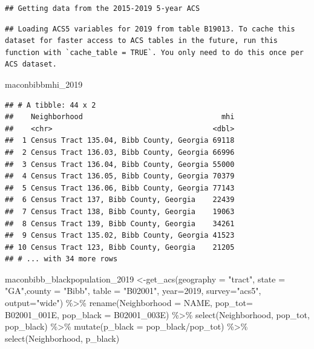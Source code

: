 \documentclass[
]{article}
\newenvironment{Shaded}{\begin{snugshade}}{\end{snugshade}}
\newcommand{\AttributeTok}[1]{\textcolor[rgb]{0.77,0.63,0.00}{#1}}
\newcommand{\DecValTok}[1]{\textcolor[rgb]{0.00,0.00,0.81}{#1}}
\newcommand{\FunctionTok}[1]{\textcolor[rgb]{0.00,0.00,0.00}{#1}}
\newcommand{\NormalTok}[1]{#1}
\newcommand{\OtherTok}[1]{\textcolor[rgb]{0.56,0.35,0.01}{#1}}
\newcommand{\SpecialCharTok}[1]{\textcolor[rgb]{0.00,0.00,0.00}{#1}}
\newcommand{\StringTok}[1]{\textcolor[rgb]{0.31,0.60,0.02}{#1}}
\begin{document}
\begin{verbatim}
## Getting data from the 2015-2019 5-year ACS
\end{verbatim}

\begin{verbatim}
## Loading ACS5 variables for 2019 from table B19013. To cache this dataset for faster access to ACS tables in the future, run this function with `cache_table = TRUE`. You only need to do this once per ACS dataset.
\end{verbatim}

\begin{Shaded}
\begin{Highlighting}[]
\NormalTok{maconbibbmhi\_2019 }
\end{Highlighting}
\end{Shaded}

\begin{verbatim}
## # A tibble: 44 x 2
##    Neighborhood                                mhi
##    <chr>                                     <dbl>
##  1 Census Tract 135.04, Bibb County, Georgia 69118
##  2 Census Tract 136.03, Bibb County, Georgia 66996
##  3 Census Tract 136.04, Bibb County, Georgia 55000
##  4 Census Tract 136.05, Bibb County, Georgia 70379
##  5 Census Tract 136.06, Bibb County, Georgia 77143
##  6 Census Tract 137, Bibb County, Georgia    22439
##  7 Census Tract 138, Bibb County, Georgia    19063
##  8 Census Tract 139, Bibb County, Georgia    34261
##  9 Census Tract 135.02, Bibb County, Georgia 41523
## 10 Census Tract 123, Bibb County, Georgia    21205
## # ... with 34 more rows
\end{verbatim}

\begin{Shaded}
\begin{Highlighting}[]
\NormalTok{maconbibb\_blackpopulation\_2019 }\OtherTok{\textless{}{-}}\FunctionTok{get\_acs}\NormalTok{(}\AttributeTok{geography =} \StringTok{"tract"}\NormalTok{, }\AttributeTok{state =} \StringTok{"GA"}\NormalTok{,}\AttributeTok{county =} \StringTok{"Bibb"}\NormalTok{, }\AttributeTok{table =} \StringTok{"B02001"}\NormalTok{, }\AttributeTok{year=}\DecValTok{2019}\NormalTok{, }\AttributeTok{survey=}\StringTok{"acs5"}\NormalTok{, }\AttributeTok{output=}\StringTok{"wide"}\NormalTok{) }\SpecialCharTok{\%\textgreater{}\%} 
\FunctionTok{rename}\NormalTok{(}\AttributeTok{Neighborhood =}\NormalTok{ NAME,}
       \AttributeTok{pop\_tot=}\NormalTok{ B02001\_001E,}
       \AttributeTok{pop\_black =}\NormalTok{ B02001\_003E) }\SpecialCharTok{\%\textgreater{}\%}
 \FunctionTok{select}\NormalTok{(Neighborhood, pop\_tot, pop\_black) }\SpecialCharTok{\%\textgreater{}\%}
 \FunctionTok{mutate}\NormalTok{(}\AttributeTok{p\_black =}\NormalTok{ pop\_black}\SpecialCharTok{/}\NormalTok{pop\_tot) }\SpecialCharTok{\%\textgreater{}\%}
 \FunctionTok{select}\NormalTok{(Neighborhood, p\_black)}
\end{Highlighting}
\end{Shaded}
\end{document}
